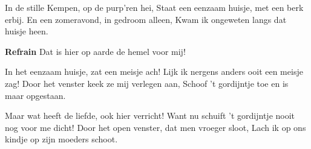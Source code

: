 \footnotemark [
ititle={Op de purp'ren hei}]


\beginverse
In de stille Kempen, op de purp'ren hei,
Staat een eenzaam huisje, met een berk erbij.
En een zomeravond, in gedroom alleen,
Kwam ik ongeweten langs dat huisje heen.
\endverse

\beginchorus
\textbf{Refrain}
{Dat is hier op aarde de hemel voor mij!}
\endchorus

\beginverse
In het eenzaam huisje, zat een meisje ach!
Lijk ik nergens anders ooit een meisje zag!
Door het venster keek ze mij verlegen aan,
Schoof 't gordijntje toe en is maar opgestaan.
\endverse

\beginverse
Maar wat heeft de liefde, ook hier verricht!
Want nu schuift 't gordijntje nooit nog voor me dicht!
Door het open venster, dat men vroeger sloot,
Lach ik op ons kindje op zijn moeders schoot.
\endverse
\endsong